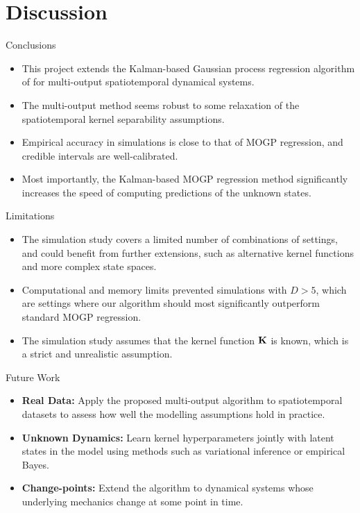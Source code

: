 \documentclass[dvipsnames, 11pt]{beamer}
\begin{document}
\section{Discussion}
\begin{frame}{Conclusions}
    \begin{itemize}
        \item
        This project extends the Kalman-based Gaussian process regression algorithm of \citet{Todescato-Efficient-2020} for multi-output spatiotemporal dynamical systems. 
        \item 
        The multi-output method seems robust to some relaxation of the spatiotemporal kernel separability assumptions.
        \item
        Empirical accuracy in simulations is close to that of MOGP regression, and credible intervals are well-calibrated.
        \item 
        Most importantly, the Kalman-based MOGP regression method significantly increases the speed of computing predictions of the unknown states.
    \end{itemize}
\end{frame}

\begin{frame}{Limitations}
    \begin{itemize}
        \item
        The simulation study covers a limited number of combinations of settings, and could benefit from further extensions, such as alternative kernel functions and more complex state spaces. 
        \item 
        Computational and memory limits prevented simulations with $D > 5$, which are settings where our algorithm should most significantly outperform standard MOGP regression.
        \item
        The simulation study assumes that the kernel function $\mathbf{K}$ is known, which is a strict and unrealistic assumption.
    \end{itemize}
\end{frame}

\begin{frame}{Future Work}
    \begin{itemize}
        \item 
        \textbf{Real Data:} Apply the proposed multi-output algorithm to spatiotemporal datasets to assess how well the modelling assumptions hold in practice. 
        \item 
        \textbf{Unknown Dynamics:} Learn kernel hyperparameters jointly with latent states in the model using methods such as variational inference or empirical Bayes.
        \item \textbf{Change-points:} Extend the algorithm to dynamical systems whose underlying mechanics change at some point in time.
    \end{itemize}
\end{frame}
\end{document}
